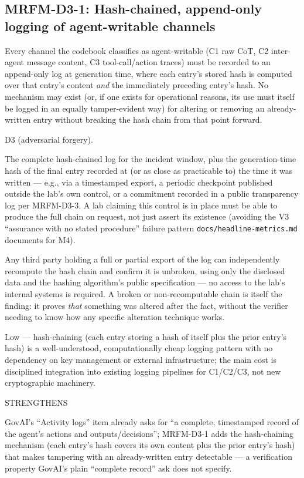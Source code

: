 \subsection*{MRFM-D3-1: Hash-chained, append-only logging of agent-writable channels}
\begin{description}[leftmargin=2.2cm, style=nextline]
\item[Requirement] Every channel the codebook classifies as agent-writable (C1 raw CoT, C2 inter-agent message content, C3 tool-call/action traces) must be recorded to an append-only log at generation time, where each entry's stored hash is computed over that entry's content \emph{and} the immediately preceding entry's hash. No mechanism may exist (or, if one exists for operational reasons, its use must itself be logged in an equally tamper-evident way) for altering or removing an already-written entry without breaking the hash chain from that point forward.
\item[Degradation defended] D3 (adversarial forgery).
\item[Evidence required] The complete hash-chained log for the incident window, plus the generation-time hash of the final entry recorded at (or as close as practicable to) the time it was written --- e.g., via a timestamped export, a periodic checkpoint published outside the lab's own control, or a commitment recorded in a public transparency log per MRFM-D3-3. A lab claiming this control is in place must be able to produce the full chain on request, not just assert its existence (avoiding the V3 ``assurance with no stated procedure'' failure pattern \texttt{docs/headline-metrics.md} documents for M4).
\item[Verifier (no lab network access needed)] Any third party holding a full or partial export of the log can independently recompute the hash chain and confirm it is unbroken, using only the disclosed data and the hashing algorithm's public specification --- no access to the lab's internal systems is required. A broken or non-recomputable chain is itself the finding: it proves \emph{that} something was altered after the fact, without the verifier needing to know how any specific alteration technique works.
\item[Cost band] Low --- hash-chaining (each entry storing a hash of itself plus the prior entry's hash) is a well-understood, computationally cheap logging pattern with no dependency on key management or external infrastructure; the main cost is disciplined integration into existing logging pipelines for C1/C2/C3, not new cryptographic machinery.
\item[vs. prior art] STRENGTHENS
\item[Prior-art note] GovAI's ``Activity logs'' item already asks for ``a complete, timestamped record of the agent's actions and outputs/decisions''; MRFM-D3-1 adds the hash-chaining mechanism (each entry's hash covers its own content plus the prior entry's hash) that makes tampering with an already-written entry detectable --- a verification property GovAI's plain ``complete record'' ask does not specify.
\end{description}

